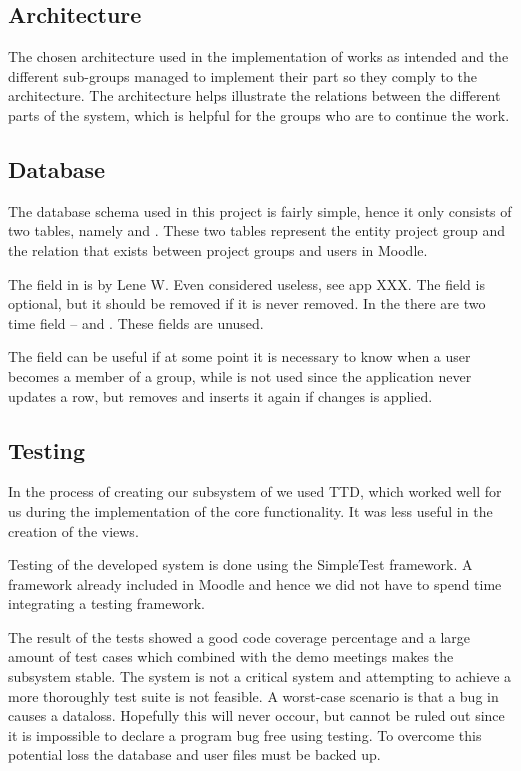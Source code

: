 \subsection{Architecture}
The chosen architecture used in the implementation of \system{} works as intended and the different sub-groups managed to implement their part so they comply to the architecture. 
The architecture helps illustrate the relations between the different parts of the system, which is helpful for the groups who are to continue the work. 




\subsection{Database}
The database schema used in this project is fairly simple, hence it only consists of two tables, namely   and . 
These two tables represent the entity project group and the relation that exists between project groups and users in Moodle. 

The  field in  is by Lene W. Even considered useless, see app XXX. 
The field is optional, but it should be removed if it is never removed. 
In the  there are two time field --  and . 
These fields are unused. 

The field  can be useful if at some point it is necessary to know when a user becomes a member of a group, while  is not used since the application never updates a row, but removes and inserts it again if changes is applied. 



\subsection{Testing}
In the process of creating our subsystem of \system{} we used TTD, which worked well for us during the implementation of the core functionality. 
It was less useful in the creation of the views. 

Testing of the developed system is done using the SimpleTest framework. 
A framework already included in Moodle and hence we did not have to spend time integrating a testing framework.

The result of the tests showed a good code coverage percentage and a large amount of test cases which combined with the demo meetings makes the subsystem stable. 
The system is not a critical system and attempting to achieve a more thoroughly test suite is not feasible. 
A worst-case scenario is that a bug in \system{} causes a dataloss. 
Hopefully this will never occour, but cannot be ruled out since it is impossible to declare a program bug free using testing.
To overcome this potential loss the database and user files must be backed up.
